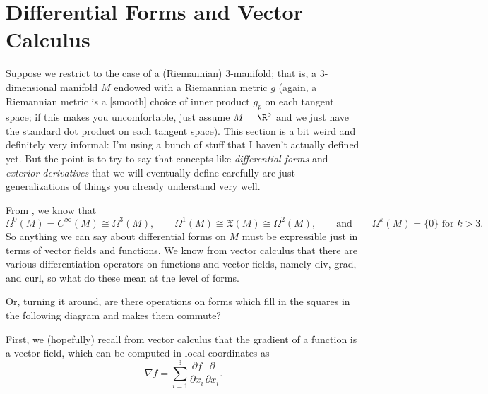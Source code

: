 
\section{Differential Forms and Vector Calculus}

Suppose we restrict to the case of a (Riemannian) 3-manifold; that is, a 3-dimensional manifold $M$ endowed with a Riemannian metric $g$ (again, a Riemannian metric is a [smooth] choice of inner product $g_p$ on each tangent space; if this makes you uncomfortable, just assume $M = \R^3$ and we just have the standard dot product on each tangent space). This section is a bit weird and definitely very informal: I'm using a bunch of stuff that I haven't actually defined yet. But the point is to try to say that concepts like \emph{differential forms} and \emph{exterior derivatives} that we will eventually define carefully are just generalizations of things you already understand very well.

From , we know that
\[
	\Omega^0(M) = C^\infty(M) \cong \Omega^3(M), \qquad \Omega^1(M) \cong \mathfrak{X}(M) \cong \Omega^2(M), \qquad \text{and} \qquad \Omega^k(M) = \{0\} \text{ for } k > 3.
\]
So anything we can say about differential forms on $M$ must be expressible just in terms of vector fields and functions. We know from vector calculus that there are various differentiation operators on functions and vector fields, namely div, grad, and curl, so what do these mean at the level of forms.

Or, turning it around, are there operations on forms which fill in the squares in the following diagram and makes them commute?

\begin{center}
\end{center}

First, we (hopefully) recall from vector calculus that the gradient of a function is a vector field, which can be computed in local coordinates as
\[
	\nabla f = \sum_{i=1}^3 \frac{\partial f}{\partial x_i}\frac{\partial}{\partial x_i}.
\]

